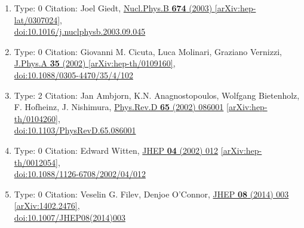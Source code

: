 \documentclass[a4paper,10pt]{article}
\begin{document}
\begin{enumerate}
\begin{enumerate}
  \item Type: 0 Citation: Joel Giedt, \href{https://www.doi.org/10.1016/j.nuclphysb.2003.09.045}{Nucl.Phys.B {\bf 674} (2003) }  \href{https://arxiv.org/abs/hep-lat/0307024}{[arXiv:hep-lat/0307024]},\\\href{https://www.doi.org/10.1016/j.nuclphysb.2003.09.045}{doi:10.1016/j.nuclphysb.2003.09.045}
  \item Type: 0 Citation: Giovanni M. Cicuta, Luca Molinari, Graziano Vernizzi, \href{https://www.doi.org/10.1088/0305-4470/35/4/102}{J.Phys.A {\bf 35} (2002) }  \href{https://arxiv.org/abs/hep-th/0109160}{[arXiv:hep-th/0109160]},\\\href{https://www.doi.org/10.1088/0305-4470/35/4/102}{doi:10.1088/0305-4470/35/4/102}
  \item Type: 2 Citation: Jan Ambjorn, K.N. Anagnostopoulos, Wolfgang Bietenholz, F. Hofheinz, J. Nishimura, \href{https://www.doi.org/10.1103/PhysRevD.65.086001}{Phys.Rev.D {\bf 65} (2002) 086001}  \href{https://arxiv.org/abs/hep-th/0104260}{[arXiv:hep-th/0104260]},\\\href{https://www.doi.org/10.1103/PhysRevD.65.086001}{doi:10.1103/PhysRevD.65.086001}
  \item Type: 0 Citation: Edward Witten, \href{https://www.doi.org/10.1088/1126-6708/2002/04/012}{JHEP {\bf 04} (2002) 012}  \href{https://arxiv.org/abs/hep-th/0012054}{[arXiv:hep-th/0012054]},\\\href{https://www.doi.org/10.1088/1126-6708/2002/04/012}{doi:10.1088/1126-6708/2002/04/012}
  \item Type: 0 Citation: Veselin G. Filev, Denjoe O'Connor, \href{https://www.doi.org/10.1007/JHEP08(2014)003}{JHEP {\bf 08} (2014) 003}  \href{https://arxiv.org/abs/1402.2476}{[arXiv:1402.2476]},\\\href{https://www.doi.org/10.1007/JHEP08(2014)003}{doi:10.1007/JHEP08(2014)003}

\end{enumerate}
\end{enumerate}
\end{document}
